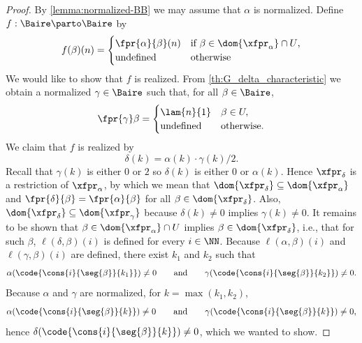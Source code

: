 \begin{proof}
  By \cref{lemma:normalized-BB} we may assume that $\alpha$ is normalized.
  Define $f: \Baire \parto \Baire$ by
  \begin{equation*}
    f(\beta)(n) =
    \begin{cases}
      \fpr{\alpha}{\beta}(n) &
      \text{if $\beta \in \dom{\xfpr_\alpha} \cap U$,} \\
      \text{undefined} & \text{otherwise}
    \end{cases}
  \end{equation*}
  We would like to show that $f$ is realized. From \cref{th:G_delta_characteristic} we obtain a normalized $\gamma \in \Baire$ such that, for all $\beta \in \Baire$,
  \begin{equation*}
    \fpr{\gamma} \beta =
    \begin{cases}
      \lam{n}{1} & \beta \in U,\\
      \text{undefined} & \text{otherwise}.
    \end{cases}
  \end{equation*}
  We claim that $f$ is realized by
  \begin{equation*}
    \delta(k) = \alpha(k) \cdot \gamma(k)/2.
  \end{equation*}
  Recall that $\gamma(k)$ is either $0$ or $2$ so $\delta(k)$ is
  either $0$ or $\alpha(k)$. Hence $\xfpr_\delta$ is a restriction of
  $\xfpr_\alpha$, by which we mean that $\dom{\xfpr_\delta} \subseteq
  \dom{\xfpr_\alpha}$ and $\fpr{\delta}{\beta} = \fpr{\alpha}{\beta}$
  for all $\beta \in \dom{\xfpr_\delta}$. Also, $\dom{\xfpr_\delta}
  \subseteq \dom{\xfpr_\gamma}$ because $\delta(k) \neq 0$ implies
  $\gamma(k) \neq 0$. It remains to be shown that $\beta \in
  \dom{\xfpr_\alpha} \cap U$ implies $\beta \in \dom{\xfpr_\delta}$,
  i.e., that for such $\beta$, $\ell(\delta, \beta)(i)$ is
  defined for every $i \in \NN$. Because $\ell(\alpha, \beta)(i)$
  and $\ell(\gamma, \beta)(i)$ are
  defined, there exist $k_1$ and $k_2$ such that
  \begin{equation*}
    \alpha(\code{\cons{i}{\seg{\beta}}{k_1}}) \neq 0
    \qquad\text{and}\qquad
    \gamma(\code{\cons{i}{\seg{\beta}}{k_2}}) \neq 0.
  \end{equation*}
  Because $\alpha$ and $\gamma$ are normalized, for $k = \max(k_1,
  k_2)$,
  \begin{equation*}
    \alpha(\code{\cons{i}{\seg{\beta}}{k}}) \neq 0
    \qquad\text{and}\qquad
    \gamma(\code{\cons{i}{\seg{\beta}}{k}}) \neq 0,
  \end{equation*}
  hence $\delta(\code{\cons{i}{\seg{\beta}}{k}}) \neq 0$, which we
  wanted to show.
\end{proof}

